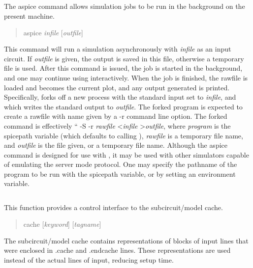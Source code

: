 \subsection{}


The {\cb aspice} command allows simulation jobs to be run in the
background on the present machine.
\begin{quote}\vt
aspice {\it infile} [{\it outfile\/}]
\end{quote}
This command will run a simulation asynchronously with
{\it infile} as an input circuit.  If {\it outfile} is given, the
output is saved in this file, otherwise a temporary file is used. 
After this command is issued, the job is started in the background,
and one may continue using {\WRspice} interactively.  When the job is
finished, the rawfile is loaded and becomes the current plot, and any
output generated is printed.  Specifically, {\WRspice} forks off a new
process with the standard input set to {\it infile}, and which writes
the standard output to {\it outfile}.  The forked program is expected
to create a rawfile with name given by a {\vt -r} command line option. 
The forked command is effectively ``{ -S -r {\it
rawfile} <{\it infile} >{\it outfile}}, where {\it program} is the
{\et spicepath} variable (which defaults to calling {\WRspice}), {\it
rawfile} is a temporary file name, and {\it outfile} is the file
given, or a temporary file name.  Although the {\cb aspice} command is
designed for use with {\WRspice}, it may be used with other simulators
capable of emulating the {\WRspice} server mode protocol.  One may
specify the pathname of the program to be run with the {\et spicepath}
variable, or by setting an environment variable.

\subsection{}


This function provides a control interface to the subcircuit/model cache.
\begin{quote}\vt
cache [{\it keyword\/}] [{\it tagname\/}]
\end{quote}

The subcircuit/model cache contains representations of blocks of input
lines that were enclosed in {\vt .cache} and {\vt .endcache} lines. 
These representations are used instead of the actual lines of input,
reducing setup time.

